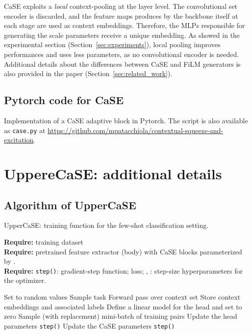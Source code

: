 \documentclass{article}
\begin{document}
CaSE exploits a \emph{local} context-pooling at the layer level. The convolutional set encoder is discarded, and the feature maps produces by the backbone itself at each stage are used as context embeddings. Therefore, the MLPs responsible for generating the scale parameters receive a unique embedding. As showed in the experimental section (Section~\ref{sec:experiments}), local pooling improves performances and uses less parameters, as no convolutional encoder is needed. Additional details about the differences between CaSE and FiLM generators is also provided in the paper (Section~\ref{sec:related_work}).

\clearpage
\subsection{Pytorch code for CaSE}

Implementation of a CaSE adaptive block in Pytorch. The script is also available as \texttt{case.py} at \url{https://github.com/mpatacchiola/contextual-squeeze-and-excitation}.



\section{UppereCaSE: additional details} \label{appendix:sec_uppercase_details}

\subsection{Algorithm of UpperCaSE} \label{appendix:ssec_algorithm}

\begin{algorithm}[H]
\small
\caption{UpperCaSE: training function for the few-shot classification setting.}
\label{alg:train_overview}
\textbf{Require:}   training dataset \\
\textbf{Require:}  pretrained feature extractor (body) with CaSE blocks parameterized by . \\
\textbf{Require:} \texttt{step()}: gradient-step function;  loss; , : step-size hyperparameters for the optimizer.
\begin{algorithmic}[1]
\vspace{0.1cm} \State Set  to random values 
    \State Sample task 
    \State Forward pass over context set  
    \State Store context embeddings and associated labels  
    \State Define a linear model for the head  and set  to zero
     
        \State Sample (with replacement) mini-batch of training pairs 
        \State Update the head parameters  \texttt{step()}
    \EndFor
    \State Update the CaSE parameters  \texttt{step()} 
\EndWhile
\vspace{0.1cm} \Statex
\end{algorithmic}
  \vspace{-0.4cm}\end{algorithm}
\end{document}

